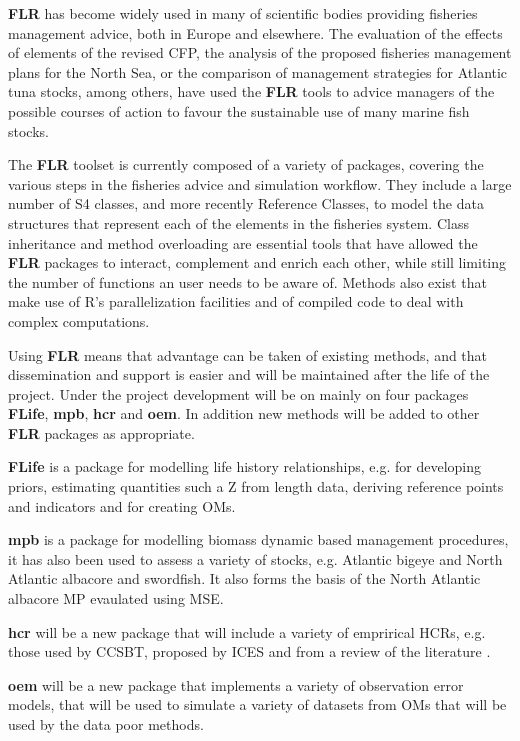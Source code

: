 \documentclass[a4paper, 10pt]{article}
\begin{document}
\textbf{FLR} has become widely used in many of scientific bodies providing fisheries management advice, both in Europe and elsewhere. The evaluation of the effects of elements of the revised CFP, the analysis of the proposed fisheries management plans for the North Sea, or the comparison of management strategies for Atlantic tuna stocks, among others, have used the \textbf{FLR} tools to advice managers of the possible courses of action to favour the sustainable use of many marine fish stocks.

The \textbf{FLR} toolset is currently composed of a variety of packages, covering the various steps in the fisheries advice and simulation workflow. They include a large number of S4 classes, and more recently Reference Classes, to model the data structures that represent each of the elements in the fisheries system. Class inheritance and method overloading are essential tools that have allowed the \textbf{FLR} packages to interact, complement and enrich each other, while still limiting the number of functions an user needs to be aware of. Methods also exist that make use of R's parallelization facilities and of compiled code to deal with complex computations.

Using \textbf{FLR} means that advantage can be taken of existing methods, and that dissemination and support is easier and will be maintained after the life of the project.  Under the project development will be on mainly on four packages \textbf{FLife}, \textbf{mpb}, \textbf{hcr} and \textbf{oem}. In addition new methods will be added to other \textbf{FLR} packages as appropriate. 

\textbf{FLife} is a package for modelling life history relationships, e.g. for developing priors, estimating quantities such a Z from length data, deriving reference points and indicators and for creating OMs.

\textbf{mpb} is a package for modelling biomass dynamic based management procedures, it has also been used to assess a variety of stocks, e.g. Atlantic bigeye and North Atlantic albacore and swordfish. It also forms the basis of the North Atlantic albacore MP evaulated using MSE.

\textbf{hcr} will be a new package that will include a variety of emprirical HCRs, e.g. those used by CCSBT, proposed by ICES and from a review of the literature \cite[e.g.][]{pomarede2010evaluating}.

\textbf{oem} will be a new package that implements a variety of observation error models, that will be used to simulate a variety of datasets from OMs that will be used by the data poor methods.
\end{document}
